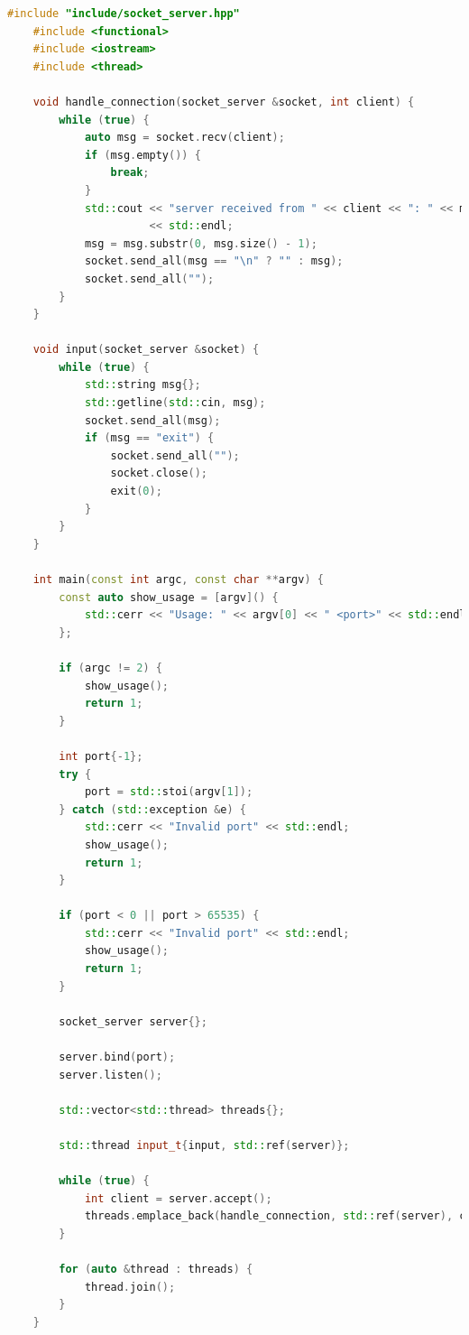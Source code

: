 \documentclass{article}
\begin{document}
\begin{lstlisting}[language=C++]
    #include "include/socket_server.hpp"
    #include <functional>
    #include <iostream>
    #include <thread>
    
    void handle_connection(socket_server &socket, int client) {
        while (true) {
            auto msg = socket.recv(client);
            if (msg.empty()) {
                break;
            }
            std::cout << "server received from " << client << ": " << msg
                      << std::endl;
            msg = msg.substr(0, msg.size() - 1);
            socket.send_all(msg == "\n" ? "" : msg);
            socket.send_all("");
        }
    }
    
    void input(socket_server &socket) {
        while (true) {
            std::string msg{};
            std::getline(std::cin, msg);
            socket.send_all(msg);
            if (msg == "exit") {
                socket.send_all("");
                socket.close();
                exit(0);
            }
        }
    }
    
    int main(const int argc, const char **argv) {
        const auto show_usage = [argv]() {
            std::cerr << "Usage: " << argv[0] << " <port>" << std::endl;
        };
    
        if (argc != 2) {
            show_usage();
            return 1;
        }
    
        int port{-1};
        try {
            port = std::stoi(argv[1]);
        } catch (std::exception &e) {
            std::cerr << "Invalid port" << std::endl;
            show_usage();
            return 1;
        }
    
        if (port < 0 || port > 65535) {
            std::cerr << "Invalid port" << std::endl;
            show_usage();
            return 1;
        }
    
        socket_server server{};
    
        server.bind(port);
        server.listen();
    
        std::vector<std::thread> threads{};
    
        std::thread input_t{input, std::ref(server)};
    
        while (true) {
            int client = server.accept();
            threads.emplace_back(handle_connection, std::ref(server), client);
        }
    
        for (auto &thread : threads) {
            thread.join();
        }
    }    
\end{lstlisting}
\end{document}
